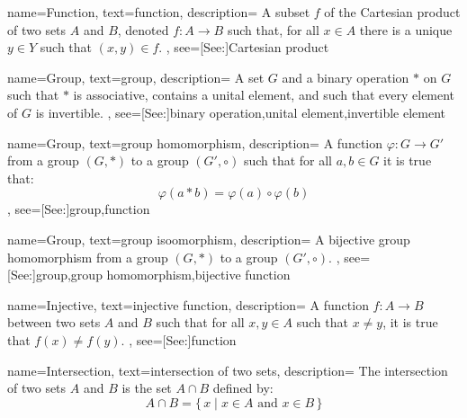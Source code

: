 {
    name={Function},
    text={function},
    description={
        A subset $f$ of the Cartesian product of two sets $A$ and $B$,
        denoted $f:A\rightarrow{B}$ such that, for all $x\in{A}$ there is
        a unique $y\in{Y}$ such that $(x,y)\in{f}$.
    },
    see=[See:]{Cartesian product}
}

{
    name={Group},
    text={group},
    description={
        A set $G$ and a binary operation $*$ on $G$ such that
        $*$ is associative, contains a unital element, and such that
        every element of $G$ is invertible.
    },
    see=[See:]{binary operation,unital element,invertible element}
}

{
    name={Group},
    text={group homomorphism},
    description={
        A function $\varphi:G\rightarrow{G}'$ from a group $(G,*)$ to a group
        $(G',\circ)$ such that for all $a,b\in{G}$ it is true that:
        \begin{equation*}
            \varphi(a*b)=\varphi(a)\circ\varphi(b)
        \end{equation*}
    },
    see=[See:]{group,function}
}

{
    name={Group},
    text={group isoomorphism},
    description={
        A bijective group homomorphism from a group $(G,*)$ to a group
        $(G',\circ)$.
    },
    see=[See:]{group,group homomorphism,bijective function}
}

{
    name={Injective},
    text={injective function},
    description={
        A function $f:A\rightarrow{B}$ between two sets $A$ and $B$ such
        that for all $x,y\in{A}$ such that $x\ne{y}$, it is true that
        $f(x)\ne{f}(y)$.
    },
    see=[See:]{function}
}

{
    name={Intersection},
    text={intersection of two sets},
    description={
        The intersection of two sets $A$ and $B$ is the set $A\cap{B}$
        defined by:
        \begin{equation*}
            A\cap{B}=\big\{\,x\;|\;x\in{A}\textrm{ and }x\in{B}\,\big\}
        \end{equation*}
    }
}

